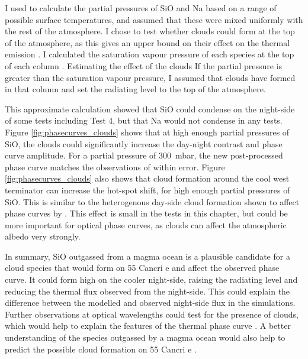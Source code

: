 I used \citet{miguel2011compositions} to calculate the partial pressures of SiO and Na based on a range of possible surface temperatures, and assumed that these were mixed uniformly with the rest of the atmosphere. I chose to test whether clouds could form at the top of the atmosphere, as this gives an upper bound on their effect on the thermal emission \citep{parmentier2016transitions}. I calculated the saturation vapour pressure of each species at the top of each column \citep{wetzel2013sio}. Estimating the effect of the clouds If the partial pressure is greater than the saturation vapour pressure, I assumed that clouds have formed in that column and set the radiating level to the top of the atmosphere.

This approximate calculation showed that SiO could condense on the night-side of some tests including Test 4, but that Na would not condense in any tests. Figure \ref{fig:phasecurves_clouds} shows that at high enough partial pressures of SiO, the clouds could significantly increase the day-night contrast and phase curve amplitude. For a partial pressure of \SI{300}{\milli\bar}, the new post-processed phase curve matches the observations of \citet{demory201655cnce} within error. Figure \ref{fig:phasecurves_clouds} also shows that cloud formation around the cool west terminator can increase the hot-spot shift, for high enough partial pressures of SiO. This is similar to the heterogenous day-side cloud formation shown to affect phase curves by  \citet{parmentier2016transitions}. This effect is small in the tests in this chapter, but could be more important for optical phase curves, as clouds can affect the atmospheric albedo very strongly.

In summary, SiO outgassed from a magma ocean is a plausible candidate for a cloud species that would form on 55 Cancri e and affect the observed phase curve. It could form high on the cooler night-side, raising the radiating level and reducing the thermal flux observed from the night-side. This could explain the difference between the modelled and observed night-side flux in the simulations. Further observations at optical wavelengths could test for the presence of clouds, which would help to explain the features of the thermal phase curve \citep{dragomir2012most}. A better understanding of the species outgassed by a magma ocean would also help to predict the possible cloud formation on 55 Cancri e \citep{miguel2011compositions}.





